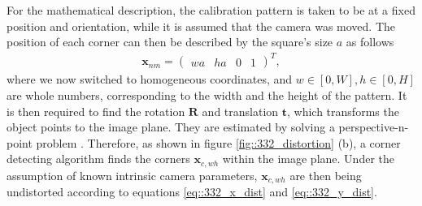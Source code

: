 For the mathematical description, the calibration pattern is taken to be at a fixed position and orientation, while it is assumed that the camera was moved. The position of each corner can then be described by the square's size $a$ as follows
\begin{align}
	\bm{x}_{nm} = \begin{pmatrix}
	wa & ha & 0 & 1
	\end{pmatrix}^T,
	\label{eq::332_square_size}
\end{align}
where we now switched to homogeneous coordinates, and $w\in[0,W],h\in[0,H]$ are whole numbers, corresponding to the width and the height of the pattern. It is then required to find the rotation $\bm{R}$ and translation $\bm{t}$, which transforms the object points to the image plane. They are estimated by solving a perspective-n-point problem \cite{fischler1981random}. Therefore, as shown in figure \ref{fig::332_distortion} (b), a corner detecting algorithm finds the corners $\bm{x}_{c,wh}$ within the image plane. Under the assumption of known intrinsic camera parameters, $\bm{x}_{c,wh}$ are then being undistorted according to equations \ref{eq::332_x_dist} and \ref{eq::332_y_dist}. 
